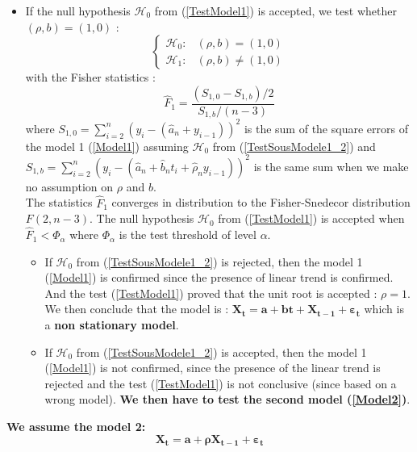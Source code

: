 \begin{itemize}
\item If the null hypothesis  $\mathcal{H}_0$  from (\ref{TestModel1}) is accepted, we test
  whether $(\rho, b) = (1,0)$ :
  \begin{equation}\label{TestSousModele1_2}
    \left\{
    \begin{array}{lr}
      \mathcal{H}_0 :  & (\rho, b) =  (1,0) \\
      \mathcal{H}_1 : & (\rho, b) \neq  (1,0)
    \end{array}
    \right.
  \end{equation}
  with the Fisher statistics :
  \begin{equation}\label{stat1}
    \displaystyle \hat{F}_1 = \frac{(S_{1,0} - S_{1,b})/2}{S_{1,b}/(n-3)}
  \end{equation}
  where $S_{1,0}=\sum_{i=2}^n\left(y_i-(\hat{a}_n+y_{i-1})\right)^2$ is the sum of the square errors of the model 1 (\ref{Model1}) assuming $\mathcal{H}_0$ from (\ref{TestSousModele1_2}) and $S_{1,b}=\sum_{i=2}^n\left(y_i-(\hat{a}_n+\hat{b}_nt_i+\hat{\rho}_ny_{i-1})\right)^2$ is the same sum when we make no assumption on $\rho$ and $b$.\\
  The statistics $\hat{F}_1$ converges in distribution to the Fisher-Snedecor distribution $F(2, n-3)$. The null hypothesis $\mathcal{H}_0$  from (\ref{TestModel1}) is accepted when $ \hat{F}_1 < \Phi_{\alpha}$ where $\Phi_{\alpha}$ is the test threshold of level $\alpha$.
  \begin{itemize}
  \item If $\mathcal{H}_0$ from (\ref{TestSousModele1_2}) is rejected, then the model 1 (\ref{Model1}) is confirmed since the presence of linear trend is confirmed.  And the  test (\ref{TestModel1}) proved that the unit root is accepted : $ \rho = 1$. We then conclude that the model is : $\boldsymbol{X_t = a + bt +  X_{t-1} + \varepsilon_{t}}$ which is a {\bf non stationary model}.
  \item  If $\mathcal{H}_0$  from (\ref{TestSousModele1_2}) is accepted, then the model 1 (\ref{Model1}) is not confirmed, since the  presence of the linear trend is rejected and the test (\ref{TestModel1}) is not conclusive (since based on a wrong model). {\bf We then have to test the second model (\ref{Model2})}.
  \end{itemize}

\end{itemize}


{\bf We assume the model 2:}
\begin{equation}\label{Model2}
  \boldsymbol{X_t = a  + \rho  X_{t-1} + \varepsilon_{t}}
\end{equation}

